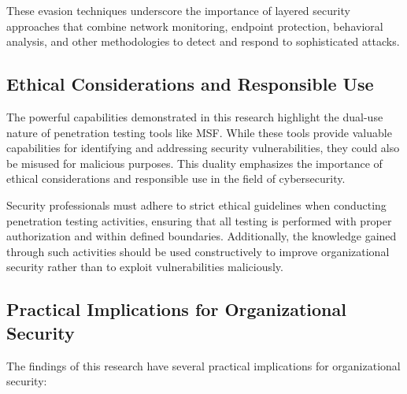 \documentclass[journal,twoside]{IEEEtran}
\begin{document}
These evasion techniques underscore the importance of layered security approaches that combine network monitoring, endpoint protection, behavioral analysis, and other methodologies to detect and respond to sophisticated attacks.

\subsection{Ethical Considerations and Responsible Use}
The powerful capabilities demonstrated in this research highlight the dual-use nature of penetration testing tools like MSF. While these tools provide valuable capabilities for identifying and addressing security vulnerabilities, they could also be misused for malicious purposes. This duality emphasizes the importance of ethical considerations and responsible use in the field of cybersecurity.

Security professionals must adhere to strict ethical guidelines when conducting penetration testing activities, ensuring that all testing is performed with proper authorization and within defined boundaries. Additionally, the knowledge gained through such activities should be used constructively to improve organizational security rather than to exploit vulnerabilities maliciously.

\subsection{Practical Implications for Organizational Security}
The findings of this research have several practical implications for organizational security:
\end{document}
